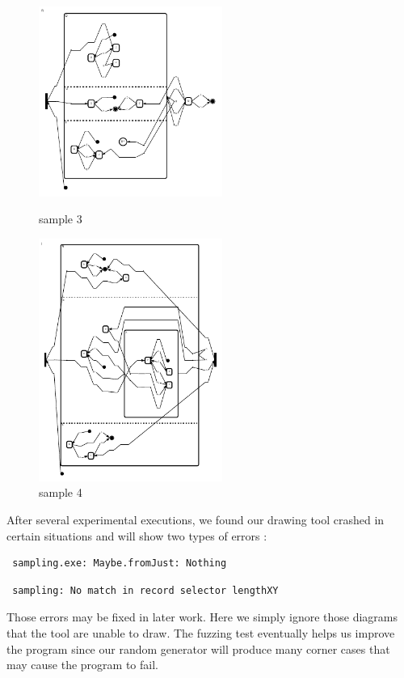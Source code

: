 \begin{figure}[htbp]
\centering
\begin{minipage}[t]{0.48\textwidth}
\centering
\includegraphics[width=6cm]{Bilder/sample4.pdf}
\caption{sample 3}
\end{minipage}
\begin{minipage}[t]{0.48\textwidth}
\centering
\includegraphics[width=6cm]{Bilder/sample2.pdf}
\caption{sample 4}
\end{minipage}
\end{figure}

After several experimental executions, we found our drawing tool crashed in certain situations and will show two types of errors :

\begin{verbatim}
 sampling.exe: Maybe.fromJust: Nothing
\end{verbatim}
\begin{verbatim}
 sampling: No match in record selector lengthXY
\end{verbatim}

Those errors may be fixed in later work. Here we simply ignore those diagrams that the tool are unable to draw.
The fuzzing test eventually helps us improve the program since our random generator will produce many corner cases that may cause the program to fail.


